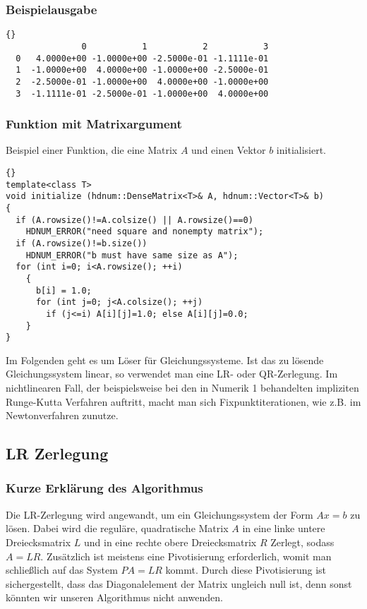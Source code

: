 \documentclass[a4paper,11pt]{article}
\theoremstyle{definition}
\begin{document}
\begin{frame}[fragile]
\frametitle{Beispielausgabe}
{\footnotesize{\begin{lstlisting}{}
               0           1           2           3
  0   4.0000e+00 -1.0000e+00 -2.5000e-01 -1.1111e-01
  1  -1.0000e+00  4.0000e+00 -1.0000e+00 -2.5000e-01
  2  -2.5000e-01 -1.0000e+00  4.0000e+00 -1.0000e+00
  3  -1.1111e-01 -2.5000e-01 -1.0000e+00  4.0000e+00
\end{lstlisting}}}
\end{frame}

\begin{frame}[fragile]
\frametitle{Funktion mit Matrixargument}
Beispiel einer Funktion, die eine Matrix $A$ und einen Vektor $b$
initialisiert.

{\footnotesize{\begin{lstlisting}{}
template<class T>
void initialize (hdnum::DenseMatrix<T>& A, hdnum::Vector<T>& b)
{
  if (A.rowsize()!=A.colsize() || A.rowsize()==0)
    HDNUM_ERROR("need square and nonempty matrix");
  if (A.rowsize()!=b.size())
    HDNUM_ERROR("b must have same size as A");
  for (int i=0; i<A.rowsize(); ++i)
    {
      b[i] = 1.0;
      for (int j=0; j<A.colsize(); ++j)
        if (j<=i) A[i][j]=1.0; else A[i][j]=0.0;
    }
}
\end{lstlisting}}}
\end{frame}

Im Folgenden geht es um Löser für Gleichungssysteme. Ist das zu
lösende Gleichungssystem linear, so verwendet man eine LR- oder
QR-Zerlegung. Im nichtlinearen Fall, der beispielsweise bei den in
Numerik 1 behandelten impliziten Runge-Kutta Verfahren auftritt, macht
man sich Fixpunktiterationen, wie z.B. im Newtonverfahren zunutze.

\subsection{LR Zerlegung}

\subsubsection{Kurze Erklärung des Algorithmus}

Die LR-Zerlegung wird angewandt, um ein Gleichungssystem der Form
$Ax=b$ zu lösen. Dabei wird die reguläre, quadratische Matrix $A$ in
eine linke untere Dreiecksmatrix $L$ und in eine rechte obere
Dreiecksmatrix $R$ Zerlegt, sodass $A=LR$. Zusätzlich ist meistens
eine Pivotisierung erforderlich, womit man schließlich auf das System
$PA=LR$ kommt. Durch diese Pivotisierung ist sichergestellt, dass das
Diagonalelement der Matrix ungleich null ist, denn sonst könnten wir
unseren Algorithmus nicht anwenden.
\end{document}
